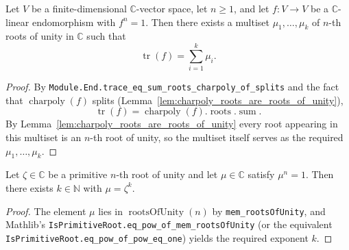 \begin{lemma}
    \label{lem:trace_eq_sum_roots_of_unity}
    Let $V$ be a finite-dimensional $\mathbb{C}$-vector space, let
    $n \geq 1$, and let $f : V \to V$ be a $\mathbb{C}$-linear
    endomorphism with $f^n = 1$. Then there exists a multiset
    $\mu_1, \ldots, \mu_k$ of $n$-th roots of unity in $\mathbb{C}$
    such that
    \[
        \operatorname{tr}(f) = \sum_{i=1}^{k} \mu_i.
    \]
\end{lemma}
\begin{proof}
    By
    \texttt{Module.End.trace\_eq\_sum\_roots\_charpoly\_of\_splits}
    and the fact that $\operatorname{charpoly}(f)$ splits
    (Lemma~\ref{lem:charpoly_roots_are_roots_of_unity}),
    \[
        \operatorname{tr}(f) =
            \operatorname{charpoly}(f).\operatorname{roots}.\operatorname{sum}.
    \]
    By Lemma~\ref{lem:charpoly_roots_are_roots_of_unity} every root
    appearing in this multiset is an $n$-th root of unity, so the
    multiset itself serves as the required $\mu_1, \ldots, \mu_k$.
\end{proof}

\begin{lemma}
    \label{lem:nth_root_in_powers}
    Let $\zeta \in \mathbb{C}$ be a primitive $n$-th root of unity
    and let $\mu \in \mathbb{C}$ satisfy $\mu^n = 1$. Then there
    exists $k \in \mathbb{N}$ with $\mu = \zeta^k$.
\end{lemma}
\begin{proof}
    The element $\mu$ lies in $\operatorname{rootsOfUnity}(n)$
    by \texttt{mem\_rootsOfUnity}, and Mathlib's
    \texttt{IsPrimitiveRoot.eq\_pow\_of\_mem\_rootsOfUnity} (or the
    equivalent \texttt{IsPrimitiveRoot.eq\_pow\_of\_pow\_eq\_one})
    yields the required exponent $k$.
\end{proof}

